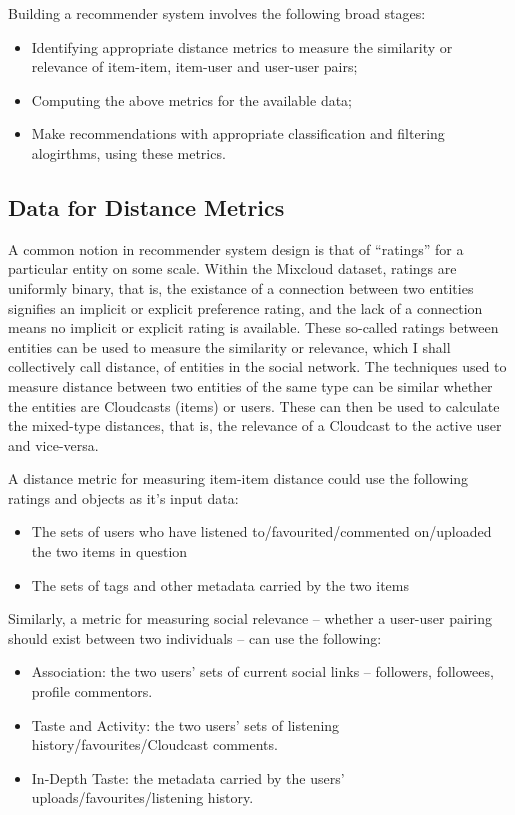 Building a recommender system involves the following broad stages: 
\begin{itemize}
 \item Identifying appropriate distance metrics to measure the similarity or relevance of item-item, item-user and user-user pairs;
 \item Computing the above metrics for the available data;
 \item Make recommendations with appropriate classification and filtering alogirthms, using these metrics.
\end{itemize}

\subsection*{Data for Distance Metrics}


A common notion in recommender system design is that of ``ratings'' for a particular entity on some scale. Within the Mixcloud dataset, ratings are uniformly binary, that is, the existance of a connection between two entities signifies an implicit or explicit preference rating, and the lack of a connection means no implicit or explicit rating is available. These so-called ratings between entities can be used to measure the similarity or relevance, which I shall collectively call distance, of entities in the social network. The techniques used to measure distance between two entities of the same type can be similar whether the entities are Cloudcasts (items) or users. These can then be used to calculate the mixed-type distances, that is, the relevance of a Cloudcast to the active user and vice-versa.

A distance metric for measuring item-item distance could use the following ratings and objects as it's input data: 
\begin{itemize}
 \item The sets of users who have listened to/favourited/commented on/uploaded the two items in question
 \item The sets of tags and other metadata carried by the two items 
\end{itemize}


Similarly, a metric for measuring social relevance -- whether a user-user pairing should exist between two individuals -- can use the following:
\begin{itemize}
 \item Association: the two users' sets of current social links -- followers, followees, profile commentors. 
 \item Taste and Activity: the two users' sets of listening history/favourites/Cloudcast comments.
 \item In-Depth Taste: the metadata carried by the users' uploads/favourites/listening history.
\end{itemize}

